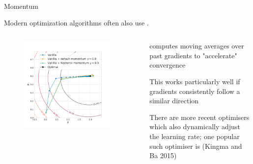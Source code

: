 \begin{frame}{Momentum}

Modern optimization algorithms often also use .

\begin{columns}
    \begin{column}{0.5\textwidth}
        \begin{figure}
            \centering
            \includegraphics[width=0.9\textwidth]{images/chapter_7/gradient_optimisation_momentum_contour.pdf}
        \end{figure}
    \end{column}
    \begin{column}{0.5\textwidth}
    \blist
        \item {} computes moving averages over past gradients to "accelerate" convergence
        \item This works particularly well if gradients consistently follow a similar direction
        \item There are more recent optimisers which also dynamically adjust the learning rate; one popular such optimiser is  (Kingma and Ba 2015)
        
    \elist
    \end{column}
\end{columns}
    
\end{frame}

